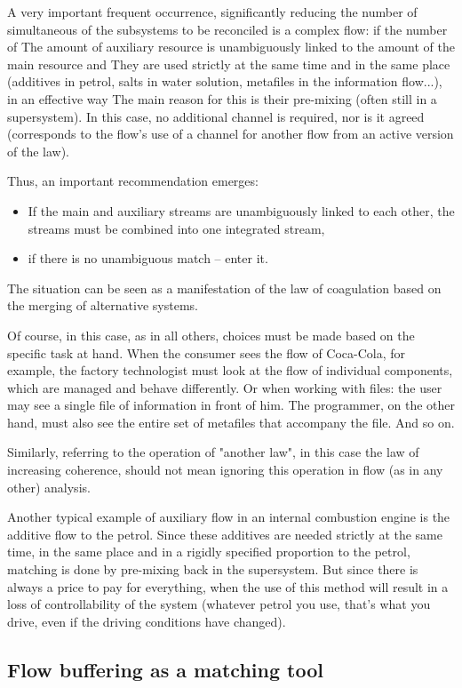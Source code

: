\documentclass[a4paper,11pt]{article}
\begin{document}
A very important frequent occurrence, significantly reducing the number of
simultaneous of the subsystems to be reconciled is a complex flow: if the
number of The amount of auxiliary resource is unambiguously linked to the
amount of the main resource and They are used strictly at the same time and in
the same place (additives in petrol, salts in water solution, metafiles in the
information flow...), in an effective way The main reason for this is their
pre-mixing (often still in a supersystem). In this case, no additional channel
is required, nor is it agreed (corresponds to the flow's use of a channel for
another flow from an active version of the law).

Thus, an important recommendation emerges:
\begin{itemize}
\item If the main and auxiliary streams are unambiguously linked to each
  other, the streams must be combined into one integrated stream,
\item if there is no unambiguous match -- enter it.
\end{itemize}
The situation can be seen as a manifestation of the law of coagulation based
on the merging of alternative systems.

Of course, in this case, as in all others, choices must be made based on the
specific task at hand. When the consumer sees the flow of Coca-Cola, for
example, the factory technologist must look at the flow of individual
components, which are managed and behave differently. Or when working with
files: the user may see a single file of information in front of him. The
programmer, on the other hand, must also see the entire set of metafiles that
accompany the file. And so on.

Similarly, referring to the operation of "another law", in this case the law
of increasing coherence, should not mean ignoring this operation in flow (as
in any other) analysis.

Another typical example of auxiliary flow in an internal combustion engine is
the additive flow to the petrol. Since these additives are needed strictly at
the same time, in the same place and in a rigidly specified proportion to the
petrol, matching is done by pre-mixing back in the supersystem. But since
there is always a price to pay for everything, when the use of this method
will result in a loss of controllability of the system (whatever petrol you
use, that's what you drive, even if the driving conditions have changed).

\subsection{Flow buffering as a matching tool}
\end{document}
